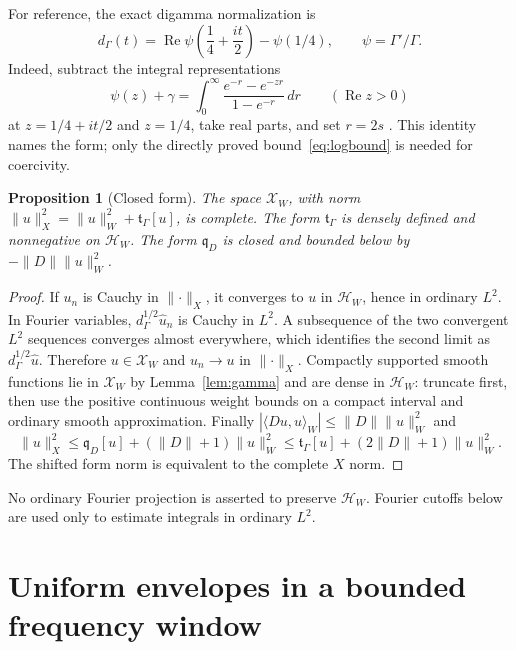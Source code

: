 \documentclass[11pt]{article}
\newtheorem{proposition}[theorem]{Proposition}
\theoremstyle{definition}
\theoremstyle{remark}
\newcommand{\HH}{\mathcal H_W}
\newcommand{\XX}{\mathcal X_W}
\newcommand{\tg}{\mathfrak t_\Gamma}
\newcommand{\qD}{\mathfrak q_D}
\newcommand{\ip}[2]{\langle #1,#2\rangle}
\newcommand{\norm}[1]{\lVert #1\rVert}
\DeclareMathOperator{\Rea}{Re}
\begin{document}
For reference, the exact digamma normalization is
\begin{equation}\label{eq:digamma}
 d_\Gamma(t)=\Rea\psi\left(\frac14+\frac{it}{2}\right)-\psi(1/4),
 \qquad \psi=\Gamma'/\Gamma.
\end{equation}
Indeed, subtract the integral representations
\[
 \psi(z)+\gamma=\int_0^\infty
 \frac{e^{-r}-e^{-zr}}{1-e^{-r}}\,dr\qquad(\Rea z>0)
\]
at $z=1/4+it/2$ and $z=1/4$, take real parts, and set $r=2s$
\cite[Eq.~5.9.16]{DLMF}. This identity names the form; only the directly
proved bound~\eqref{eq:logbound} is needed for coercivity.

\begin{proposition}[Closed form]\label{prop:closed}
The space $\XX$, with norm
$\norm u_X^2=\norm u_W^2+\tg[u]$, is complete. The form $\tg$ is densely
defined and nonnegative on $\HH$. The form $\qD$ is closed and bounded
below by $-\norm D\norm u_W^2$.
\end{proposition}
\begin{proof}
If $u_n$ is Cauchy in $\norm{\cdot}_X$, it converges to $u$ in $\HH$,
hence in ordinary $L^2$. In Fourier variables,
$d_\Gamma^{1/2}\widehat u_n$ is Cauchy in $L^2$. A subsequence of the two
convergent $L^2$ sequences converges almost everywhere, which identifies
the second limit as $d_\Gamma^{1/2}\widehat u$. Therefore $u\in\XX$ and
$u_n\to u$ in $\norm{\cdot}_X$. Compactly supported smooth functions lie
in $\XX$ by Lemma~\ref{lem:gamma} and are dense in $\HH$: truncate first,
then use the positive continuous weight bounds on a compact interval and
ordinary smooth approximation. Finally
$|\ip{Du}{u}_W|\le\norm D\norm u_W^2$ and
\[
 \norm u_X^2\le \qD[u]+(\norm D+1)\norm u_W^2
 \le \tg[u]+(2\norm D+1)\norm u_W^2.
\]
The shifted form norm is equivalent to the complete $X$ norm.
\end{proof}

No ordinary Fourier projection is asserted to preserve $\HH$. Fourier
cutoffs below are used only to estimate integrals in ordinary $L^2$.

\section{Uniform envelopes in a bounded frequency window}\label{sec:ode}
\end{document}
